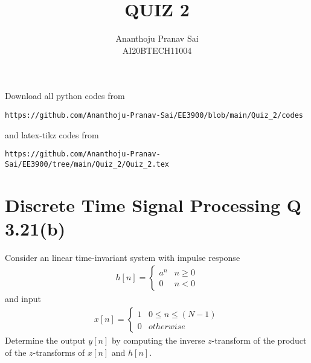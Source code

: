 \documentclass[journal,12pt,twocolumn]{IEEEtran}
\begin{document}
     \def\centbox#1{\makebox[0in]{#1}}
     \def\topbox#1{\raisebox{-\baselineskip}[0in][0in]{#1}}
     \def\midbox#1{\raisebox{-0.5\baselineskip}[0in][0in]{#1}}
\vspace{3cm}
\title{QUIZ 2}
\author{Ananthoju Pranav Sai \\ AI20BTECH11004}
\maketitle
\newpage
\bigskip
\renewcommand{\thefigure}{\theenumi}
\renewcommand{\thetable}{\theenumi}
Download all python codes from 
\begin{lstlisting}
https://github.com/Ananthoju-Pranav-Sai/EE3900/blob/main/Quiz_2/codes
\end{lstlisting}
%
and latex-tikz codes from 
%
\begin{lstlisting}
https://github.com/Ananthoju-Pranav-Sai/EE3900/tree/main/Quiz_2/Quiz_2.tex
\end{lstlisting}
%
\section{Discrete Time Signal Processing Q 3.21(b)}
Consider an linear time-invariant system with impulse response
\begin{align}
    h[n] = \begin{cases} 
                a^{n} & n\geq 0\\
                0 & n<0
            \end{cases}
\end{align}
and input 
\begin{align}
    x[n] = \begin{cases} 
                1 & 0\leq n\leq (N-1)\\
                0 & otherwise
            \end{cases}
\end{align}
Determine the output $y[n]$ by computing the inverse $z$-transform of the product of the $z$-transforms of $x[n]$ and $h[n]$.
\end{document}
